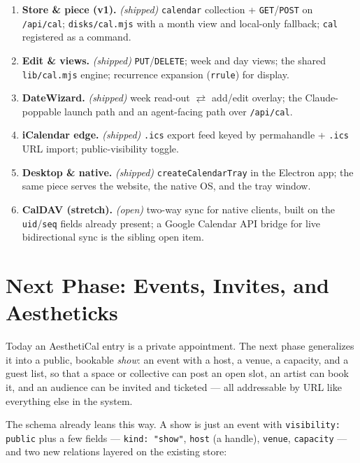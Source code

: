 \documentclass[10pt,letterpaper,twocolumn]{article}
\begin{document}
\begin{enumerate}
  \item \textbf{Store \& piece (v1).} \emph{(shipped)} \texttt{calendar} collection + \texttt{GET}/\texttt{POST} on \texttt{/api/cal}; \texttt{disks/cal.mjs} with a month view and local-only fallback; \texttt{cal} registered as a command.
  \item \textbf{Edit \& views.} \emph{(shipped)} \texttt{PUT}/\texttt{DELETE}; week and day views; the shared \texttt{lib/cal.mjs} engine; recurrence expansion (\texttt{rrule}) for display.
  \item \textbf{DateWizard.} \emph{(shipped)} week read-out $\rightleftarrows$ add/edit overlay; the Claude-poppable launch path and an agent-facing path over \texttt{/api/cal}.
  \item \textbf{iCalendar edge.} \emph{(shipped)} \texttt{.ics} export feed keyed by permahandle + \texttt{.ics} URL import; public-visibility toggle.
  \item \textbf{Desktop \& native.} \emph{(shipped)} \texttt{createCalendarTray} in the Electron app; the same piece serves the website, the native OS, and the tray window.
  \item \textbf{CalDAV (stretch).} \emph{(open)} two-way sync for native clients, built on the \texttt{uid}/\texttt{seq} fields already present; a Google Calendar API bridge for live bidirectional sync is the sibling open item.
\end{enumerate}

\section{Next Phase: Events, Invites, and Aestheticks}

Today an AesthetiCal entry is a private appointment. The next phase generalizes it into a public, bookable \emph{show}: an event with a host, a venue, a capacity, and a guest list, so that a space or collective can post an open slot, an artist can book it, and an audience can be invited and ticketed --- all addressable by URL like everything else in the system.

The schema already leans this way. A show is just an event with \texttt{visibility:\,public} plus a few fields --- \texttt{kind:\,"show"}, \texttt{host} (a handle), \texttt{venue}, \texttt{capacity} --- and two new relations layered on the existing store:
\end{document}
